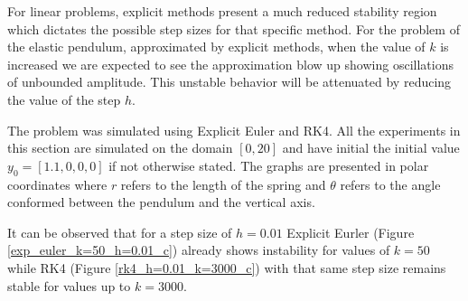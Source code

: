 \documentclass{report}
\begin{document}
For linear problems, explicit methods present a much reduced stability region which dictates the possible step sizes for that specific method.
For the problem of the elastic pendulum, approximated by explicit methods, when the value of $k$ is increased we are expected to see the approximation blow up showing oscillations of unbounded amplitude.
This unstable behavior will be attenuated by reducing the value of the step $h$.


The problem was simulated using Explicit Euler and RK4.
All the experiments in this section are simulated on the domain $[0,20]$ and have initial the initial value $y_0 = [1.1, 0, 0, 0]$ if not otherwise stated.
The graphs are presented in polar coordinates where $r$ refers to the length of the spring and $\theta$ refers to the angle conformed between the pendulum and the vertical axis.

It can be observed that for a step size of $h=0.01$ Explicit Eurler (Figure \ref{exp_euler_k=50_h=0.01_c}) already shows instability for values of $k=50$ while RK4 (Figure \ref{rk4_h=0.01_k=3000_c}) with that same step size remains stable for values up to $k=3000$.
\end{document}
